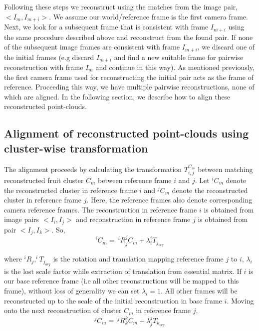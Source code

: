 Following these steps we reconstruct using the matches from the image pair, $< I_m, I_{m+i}>$.  We assume our world/reference frame is the first camera frame. Next, we look for a subsequent frame that is consistent with frame $I_{m+i}$ using the same procedure described above and reconstruct from the found pair. If none of the subsequent image frames are consistent with frame $I_{m+i}$, we discard one of the initial frames (e.g discard $I_{m+i}$ and find a new suitable frame for pairwise reconstruction with frame $I_m$ and continue in this way). As mentioned previously, the first camera frame used for reconstructing the initial pair acts as the frame of reference. Proceeding this way, we have multiple pairwise reconstructions, none of which are aligned. In the following section, we describe how to align these reconstructed point-clouds.





\subsection{Alignment of reconstructed point-clouds using cluster-wise  transformation}\label{subsec:alignment}

The alignment proceeds by calculating the transformation $T^{C_m}_{i,j}$ between matching reconstructed fruit cluster $C_m$ between reference frame $i$ and $j$. Let $^i{C_m}$ denote the reconstructed cluster in reference frame $i$ and $^j{C_m}$ denote the reconstructed cluster in reference frame $j$. Here, the reference frames also denote corresponding camera reference frames. The reconstruction in reference frame $i$ is obtained from image pairs $<I_i, I_j>$ and reconstruction in reference frame $j$  is obtained from pair $<I_j,I_k>$. So, 
\begin{equation}
^i{C_m} =\  ^iR_j ^j{C_m} + \lambda_i ^iT_{j_{org}}
\label{eq:fri}
\end{equation}


where $^i R_j,^iT_{j_{org}}$ is the rotation and translation mapping reference frame $j$ to $i$, $\lambda_i$ is the lost scale factor while extraction of translation from essential matrix. If $i$ is our base reference frame (i.e all other reconstructions will be mapped to this frame), without loss of generality we can set $\lambda_i = 1$. All other frames will be reconstructed up to the scale of the initial reconstruction in base frame $i$. Moving onto the next reconstruction of cluster $C_m$ in reference frame $j$,
\begin{equation}
^j{C_m} =\ ^jR_k ^k{C_m} + \lambda_j ^jT_{k_{org}}
\label{eq:frj}
\end{equation}


